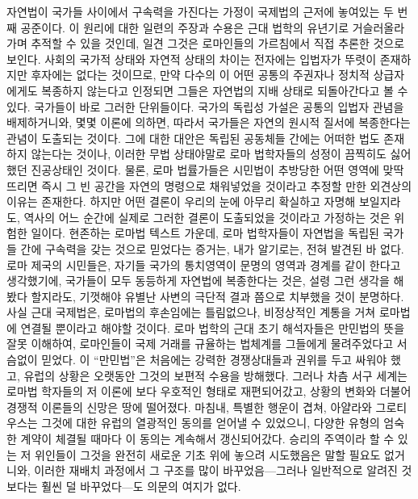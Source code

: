 자연법이 국가들 사이에서 구속력을 가진다는 가정이
국제법의 근저에 놓여있는 두 번째 공준이다.
이 원리에 대한 일련의 주장과 수용은 근대 법학의 유년기로 거슬러올라가며
추적할 수 있을 것인데,
일견 그것은 로마인들의 가르침에서 직접 추론한 것으로 보인다.
사회의 국가적 상태와 자연적 상태의 차이는
전자에는 입법자가 뚜렷이 존재하지만 후자에는 없다는 것이므로,
만약 다수의 이
어떤 공통의 주권자나 정치적 상급자에게도
복종하지 않는다고 인정되면 그들은 자연법의 지배 상태로 되돌아간다고 볼 수 있다.
국가들이 바로 그러한 단위들이다.
국가의 독립성 가설은 공통의 입법자 관념을 배제하거니와,
몇몇 이론에 의하면,
따라서 국가들은 자연의 원시적 질서에 복종한다는 관념이 도출되는 것이다.
그에 대한 대안은 독립된 공동체들 간에는 어떠한 법도 존재하지 않는다는 것이나,
이러한 무법 상태야말로
로마 법학자들의 성정이 끔찍히도 싫어했던 진공상태인 것이다.
물론, 로마 법률가들은 시민법이 추방당한 어떤 영역에 맞딱뜨리면
즉시 그 빈 공간을 자연의 명령으로 채워넣었을 것이라고 추정할 만한
외견상의 이유는 존재한다.
하지만 어떤 결론이 우리의 눈에 아무리 확실하고 자명해 보일지라도,
역사의 어느 순간에
실제로 그러한 결론이 도출되었을 것이라고 가정하는 것은 위험한 일이다.
현존하는 로마법 텍스트 가운데,
로마 법학자들이 자연법을 독립된 국가들 간에 구속력을 갖는 것으로
믿었다는 증거는, 내가 알기로는, 전혀 발견된 바 없다.
로마 제국의 시민들은,
자기들 국가의 통치영역이 문명의 영역과 경계를 같이 한다고 생각했기에,
국가들이 모두 동등하게 자연법에 복종한다는 것은,
설령 그런 생각을 해봤다 할지라도,
기껏해야 유별난 사변의 극단적 결과 쯤으로 치부했을 것이 분명하다.
사실 근대 국제법은,
로마법의 후손임에는 틀림없으나,
비정상적인 계통을 거쳐 로마법에 연결될 뿐이라고 해야할 것이다.
로마 법학의 근대 초기 해석자들은
만민법의 뜻을 잘못 이해하여,
로마인들이 국제 거래를 규율하는 법체계를 그들에게 물려주었다고
서슴없이 믿었다.
이 ``만민법''은 처음에는 강력한 경쟁상대들과
권위를 두고 싸워야 했고,
유럽의 상황은 오랫동안 그것의 보편적 수용을 방해했다.
그러나 차츰 서구 세계는 로마법 학자들의 저 이론에
보다 우호적인 형태로 재편되어갔고,
상황의 변화와 더불어 경쟁적 이론들의 신망은 땅에 떨어졌다.
마침내, 특별한 행운이 겹쳐,
아얄라와 그로티우스는 그것에 대한 유럽의 열광적인 동의를
얻어낼 수 있었으니, 다양한 유형의 엄숙한 계약이 체결될 때마다 이 동의는
계속해서 갱신되어갔다.
승리의 주역이라 할 수 있는 저 위인들이
그것을 완전히 새로운 기초 위에 놓으려 시도했음은 말할 필요도 없거니와,
이러한 재배치 과정에서 그 구조를
많이 바꾸었음---그러나 일반적으로 알려진 것보다는 훨씬 덜 바꾸었다---도
의문의 여지가 없다.
